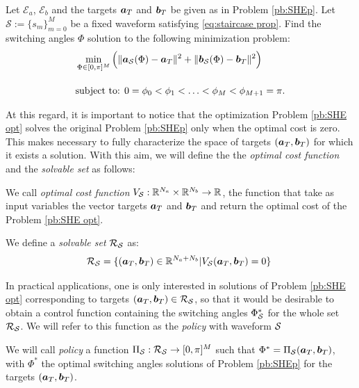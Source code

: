 \documentclass[twocolumn]{autart}    %
\begin{document}
\begin{problem}\label{pb:SHE opt}
Let $\mathcal{E}_a$, $\mathcal{E}_b$ and the targets $\bm{a}_T$ and $\bm{b}_T$ be given as in Problem \ref{pb:SHEp}.  Let $\mathcal S := \{ s_m\}_{m=0}^M$ be a fixed waveform satisfying \eqref{eq:staircase prop}.  Find the switching angles $\Phi$ solution to the following minimization problem:
\begin{align}
	&\min_{\Phi \in [0,\pi]^{M}} \Big( \|\bm{a}_{\mathcal{S}} (\Phi) - \bm{a}_T\|^2 + \| \bm{b}_{\mathcal{S}} (\Phi) - \bm{b}_T\|^2\Big)\notag 
	\\[10pt]
	&\mbox{subject to: } 0 = \phi_0 <\phi_1 < \ldots < \phi_{M} < \phi_{M+1} = \pi. \notag 
\end{align}
\end{problem}
At this regard, it is important to notice that the optimization Problem \ref{pb:SHE opt} solves the original Problem \ref{pb:SHEp} only when the optimal cost is zero. This makes necessary to fully characterize the space of targets $(\bm{a}_T,\bm{b}_T)$ for which it exists a solution. With this aim, we will define the the \textit{optimal cost function} and the \textit{solvable set} as follows:
\vspace{1em}
\begin{definition}
We call \textit{optimal cost function} $V_{\mathcal{S}}:\mathbb{R}^{N_a}\times \mathbb{R}^{N_b} \rightarrow \mathbb{R}$, the function that take as input variables the vector targets $\bm{a}_T$ and $\bm{b}_T$ and return the optimal cost of the Problem \ref{pb:SHE opt}.
\end{definition}

\vspace{1em}
\begin{definition}
We define a \textit{solvable set} $\mathcal{R}_{\mathcal{S}}$ as:
\begin{gather}
	\mathcal{R}_{\mathcal{S}} = \{ (\bm{a}_T,\bm{b}_T) \in \mathbb{R}^{N_a+N_b} | V_{\mathcal{S}}(\bm{a}_T,\bm{b}_T) = 0\}\
\end{gather}
\end{definition}
In practical applications, one is only interested in solutions of Problem \ref{pb:SHE opt} corresponding to targets $(\bm{a}_T,\bm{b}_T) \in \mathcal{R}_{\mathcal{S}}$, so that it would be desirable to obtain a control function containing the switching angles $\Phi^*_{\mathcal{S}}$ for the whole set $\mathcal{R}_{\mathcal{S}}$. We will refer to this function as the \textit{policy} with waveform $\mathcal{S}$

\vspace{1em}
\begin{definition}[policy]
We will call \textit{policy} a function $\Pi_{\mathcal{S}}: \mathcal{R}_{\mathcal{S}} \rightarrow [0,\pi]^M$ such that $\Phi^* = \Pi_{\mathcal{S}}(\bm{a}_T,\bm{b}_T)$, with $\Phi^*$ the optimal switching angles solutions of Problem \ref{pb:SHEp} for the targets $(\bm{a}_T,\bm{b}_T)$.
\end{definition} 
\end{document}
